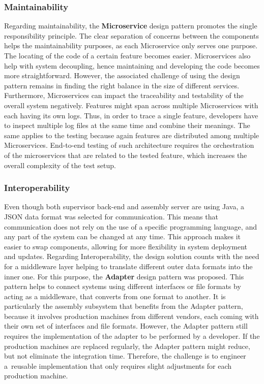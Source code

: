 \documentclass[conference]{IEEEtran}
\begin{document}
\subsubsection{Maintainability}
Regarding maintainability, the \textbf{Microservice} design pattern promotes the single responsibility principle. The clear separation of concerns between the components helps the maintainability purposes, as each Microservice only serves one purpose. The locating of the code of a certain feature becomes easier. Microservices also help with system decoupling, hence maintaining and developing the code becomes more straightforward. However, the associated challenge of using the design pattern remains in finding the right balance in the size of different services. Furthermore, Microservices can impact the traceability and testability of the overall system negatively. Features might span across multiple Microservices with each having its own logs. Thus, in order to trace a single feature, developers have to inspect multiple log files at the same time and combine their meanings. The same applies to the testing because again features are distributed among multiple Microservices. End-to-end testing of such architecture requires the orchestration of the microservices that are related to the tested feature, which increases the overall complexity of the test setup.

\subsubsection{Interoperability}
Even though both supervisor back-end and assembly server are using Java, a JSON data format was selected for communication. This means that communication does not rely on the use of a specific programming language, and any part of the system can be changed at any time. This approach makes it easier to swap components, allowing for more flexibility in system deployment and updates. Regarding Interoperability, the design solution counts with the need for a middleware layer helping to translate different outer data formats into the inner one. For this purpose, the \textbf{Adapter} design pattern was proposed. This pattern helps to connect systems using different interfaces or file formats by acting as a middleware, that converts from one format to another. It is particularly the assembly subsystem that benefits from the Adapter pattern, because it involves production machines from different vendors, each coming with their own set of interfaces and file formats. However, the Adapter pattern still requires the implementation of the adapter to be performed by a developer. If the production machines are replaced regularly, the Adapter pattern might reduce, but not eliminate the integration time. Therefore, the challenge is to engineer a~reusable implementation that only requires slight adjustments for each production machine.
\end{document}
